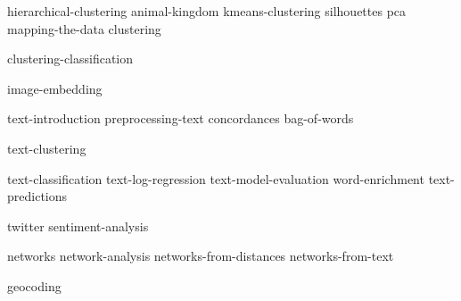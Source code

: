 \documentclass[symmetric, justified, a4paper]{tufte-book}
\begin{document}

{hierarchical-clustering}
{animal-kingdom}
{kmeans-clustering}
{silhouettes}
{pca}
{mapping-the-data}
{clustering}

{clustering-classification}

{image-embedding}


{text-introduction}
{preprocessing-text}
{concordances}
{bag-of-words}

{text-clustering}

{text-classification}
{text-log-regression}
{text-model-evaluation}
{word-enrichment}
{text-predictions}

{twitter}
{sentiment-analysis}


{networks}
{network-analysis}
{networks-from-distances}
{networks-from-text}


{geocoding}

\backmatter
\nocite{*}





\printindex
\end{document}
